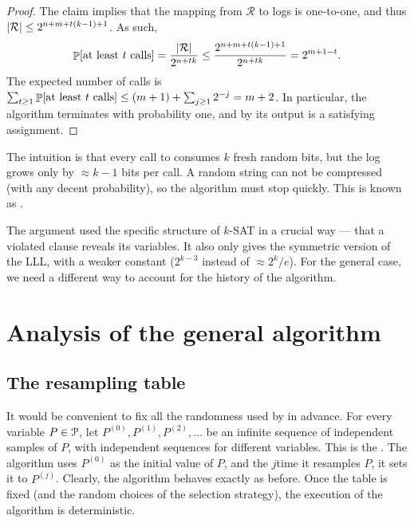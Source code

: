 \begin{proof}
    \smallskip

    The claim implies that the mapping from $\mathcal{R}$ to logs is
    one-to-one, and thus
    $\left| {\mathcal{R}} \right| \leq 2^{n + m + t(k-1) + 1}$. As such,
    \begin{equation*}
        \Prob{\text{at least $t$ calls}}%
        =%
        \frac{\cardin{\mathcal{R}}}{2^{n+tk}}%
        \leq%
        \frac{2^{n + m + t(k-1) + 1}}{2^{n+tk}}%
        =%
        2^{m+1-t}.
    \end{equation*}
    The expected number of calls is
    $\sum_{t \geq 1} \Prob{\text{at least $t$ calls}} \leq (m+1) +
    \sum_{j \geq 1} 2^{-j} = m+2$. In particular, the algorithm
    terminates with probability one, and by  its
    output is a satisfying assignment.
\end{proof}

\begin{remark}
    The intuition is that every call to \FixAlg consumes $k$ fresh
    random bits, but the log grows only by $\approx k-1$ bits per
    call. A random string can not be compressed (with any decent
    probability), so the algorithm must stop quickly. This is known
    as .

    The argument used the specific structure of $k$-SAT in a crucial
    way --- that a violated clause reveals its variables. It also only
    gives the symmetric version of the LLL, with a weaker constant
    ($2^{k-3}$ instead of $\approx 2^k/e$). For the general case, we
    need a different way to account for the history of the algorithm.
\end{remark}


\section{Analysis of the general algorithm}

\subsection{The resampling table}

It would be convenient to fix all the randomness used by \MTAlg in
advance. For every variable $P \in \EuScript{P}$, let
$P^{(0)}, P^{(1)}, P^{(2)}, \ldots$ be an infinite sequence of
independent samples of $P$, with independent sequences for different
variables. This is the
. The algorithm
uses $P^{(0)}$ as the initial value of $P$, and the $j$\th time it
resamples $P$, it sets it to $P^{(j)}$. Clearly, the algorithm
behaves exactly as before. Once the table is fixed (and the random
choices of the selection strategy), the execution of the algorithm is
deterministic.

